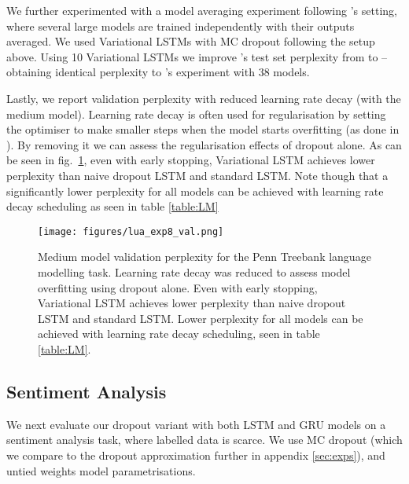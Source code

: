 \documentclass{article}
\theoremstyle{definition}
\begin{document}
We further experimented with a model averaging experiment following \citep{zaremba2014recurrent}'s setting, where several large models are trained independently with their outputs averaged.
We used Variational LSTMs with MC dropout following the setup above.
Using 10 Variational LSTMs we improve \citep{zaremba2014recurrent}'s test set perplexity from  to  -- obtaining identical perplexity to \citep{zaremba2014recurrent}'s experiment with 38 models. 

Lastly, we report validation perplexity with reduced learning rate decay (with the medium model). 
Learning rate decay is often used for regularisation by setting the optimiser to make smaller steps when the model starts overfitting (as done in \citep{zaremba2014recurrent}).
By removing it we can assess the regularisation effects of dropout alone.
As can be seen in fig.\ \ref{fig:LM}, 
even with early stopping, Variational LSTM achieves lower perplexity than naive dropout LSTM and standard LSTM. Note though that a significantly lower perplexity for all models can be achieved with learning rate decay scheduling as seen in table \ref{table:LM}






\begin{figure}[b!]
\vspace{-8mm}
\texttt{[image: figures/lua\_exp8\_val.png]}
\vspace{-7mm}
\caption{Medium model validation perplexity for the Penn Treebank language modelling task. Learning rate decay was reduced to assess model overfitting using dropout alone. Even with early stopping, Variational LSTM achieves lower perplexity than naive dropout LSTM and standard LSTM. 
Lower perplexity for all models can be achieved with learning rate decay scheduling, seen in table \ref{table:LM}.}
\label{fig:LM}
\vspace{2mm}
\end{figure}


\subsection{Sentiment Analysis}

We next evaluate our dropout variant with both LSTM and GRU models on a sentiment analysis task, where labelled data is scarce. We use MC dropout (which we compare to the dropout approximation further in appendix \ref{sec:exps}), and untied weights model parametrisations. 
\end{document}
